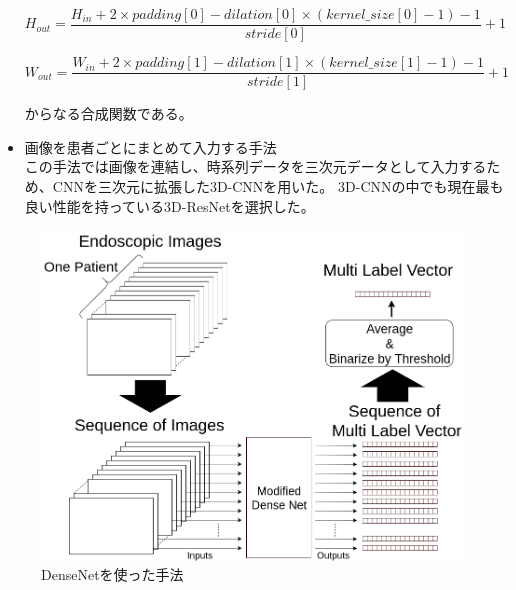 \begin{itemize}
\begin{equation}
H_{out} = \frac{H_{in} + 2 \times padding[0] - dilation[0] \times (kernel\_size[0] - 1) - 1}{stride[0]} + 1
\end{equation}

\begin{equation}
W_{out} = \frac{W_{in} + 2 \times padding[1] - dilation[1] \times (kernel\_size[1] - 1) - 1}{stride[1]} + 1
\end{equation}

からなる合成関数である。

    \item 画像を患者ごとにまとめて入力する手法\\
この手法では画像を連結し、時系列データを三次元データとして入力するため、CNNを三次元に拡張した3D-CNNを用いた。
3D-CNNの中でも現在最も良い性能を持っている3D-ResNet\cite{3D_ResNet}を選択した。
\end{itemize}

\begin{figure}[htbp]
    \begin{center}
        \includegraphics[width=122mm]{./fig/ieice2.png}
        \caption{DenseNetを使った手法}
        \label{fig:densenet}
    \end{center}
\end{figure}

